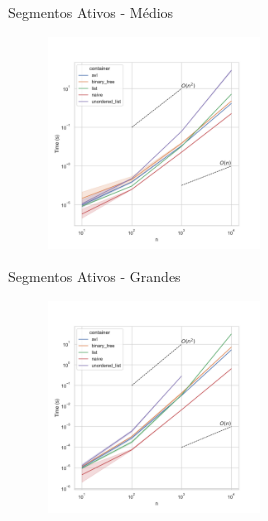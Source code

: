 \documentclass[aspectratio=169,usenames,dvipsnames]{beamer}
\begin{document}
\begin{frame}{Segmentos Ativos - Médios}
      \begin{figure}
        \includegraphics[width=0.5\textwidth]{figs/tempos/plot_random_medium_time.pdf}
      \end{figure}
\end{frame}

\begin{frame}{Segmentos Ativos - Grandes}
      \begin{figure}
        \includegraphics[width=0.5\textwidth]{figs/tempos/plot_random_big_time.pdf}
      \end{figure}
\end{frame}
\end{document}
